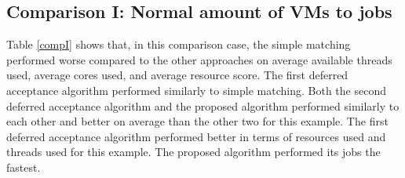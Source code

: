 \documentclass[conference]{IEEEtran}
\begin{document}
\begin{table}[h]
     \newline
     \caption{Comparison III}
     \label{compIII}
\end{table}


\subsection{Comparison I:  Normal amount of VMs to jobs}
Table \ref{compI} shows that, in this comparison case, the simple matching performed worse compared to 
the other approaches
on average available threads used, average cores used, and average resource
 score.  
 The first deferred acceptance algorithm performed similarly to simple matching.  
 Both the second deferred acceptance algorithm and the proposed 
algorithm performed similarly to each other and better on average than the other 
two for this example.  
The first deferred acceptance algorithm performed better 
in terms of resources used and threads used for this example.  
The proposed algorithm performed its jobs the fastest.
\end{document}
